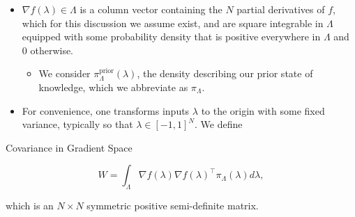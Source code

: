 \documentclass[11pt]{beamer}
\begin{document}
\begin{frame}

\begin{itemize}

\item $\nabla f(\lambda)\in \Lambda$ is a column vector containing the $N$ partial derivatives of $f$, which for this discussion we assume exist, and are square integrable in $\Lambda$ equipped with some probability density that is positive everywhere in $\Lambda$ and 0 otherwise.

\begin{itemize}
		\item We consider $\pi_\Lambda^\text{prior}(\lambda)$, the density describing our prior state of knowledge, which we abbreviate as $\pi_\Lambda$.
\end{itemize}

\item For convenience, one transforms inputs $\lambda$ to the origin with some fixed variance, typically so that $\lambda\in [-1,1]^N$. We define

\end{itemize}

\begin{block}{Covariance in Gradient Space \footnotemark[1]}

\begin{equation} \label{eq:4}
W=\int_\Lambda \nabla f(\lambda) \nabla f(\lambda)^\top  \pi_\Lambda(\lambda) d\lambda,
\end{equation} 

\noindent which is an $N\times N$ symmetric positive semi-definite matrix.

\end{block}



\end{frame}
\end{document}
